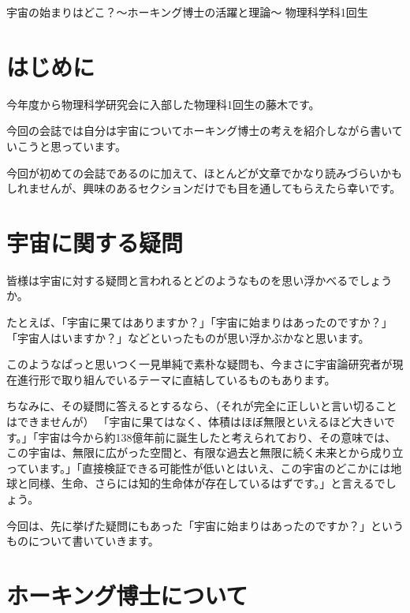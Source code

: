 \documentclass[10pt,b5paper,papersize,dvipdfmx]{jsbook}
\begin{document}


\kaishititle%
  {宇宙の始まりはどこ？～ホーキング博士の活躍と理論～}%
  {物理科学科1回生}%
  {}%

%
\section*{はじめに}
今年度から物理科学研究会に入部した物理科1回生の藤木です。\par
今回の会誌では自分は宇宙についてホーキング博士の考えを紹介しながら書いていこうと思っています。\par
今回が初めての会誌であるのに加えて、ほとんどが文章でかなり読みづらいかもしれませんが、興味のあるセクションだけでも目を通してもらえたら幸いです。\par


%
\section{宇宙に関する疑問}
皆様は宇宙に対する疑問と言われるとどのようなものを思い浮かべるでしょうか。\par
たとえば、「宇宙に果てはありますか？」「宇宙に始まりはあったのですか？」「宇宙人はいますか？」などといったものが思い浮かぶかなと思います。\par
このようなぱっと思いつく一見単純で素朴な疑問も、今まさに宇宙論研究者が現在進行形で取り組んでいるテーマに直結しているものもあります。\par
ちなみに、その疑問に答えるとするなら、（それが完全に正しいと言い切ることはできませんが）
「宇宙に果てはなく、体積はほぼ無限といえるほど大きいです。」「宇宙は今から約138億年前に誕生したと考えられており、その意味では、この宇宙は、無限に広がった空間と、有限な過去と無限に続く未来とから成り立っています。」「直接検証できる可能性が低いとはいえ、この宇宙のどこかには地球と同様、生命、さらには知的生命体が存在しているはずです。」と言えるでしょう。\par
今回は、先に挙げた疑問にもあった「宇宙に始まりはあったのですか？」というものについて書いていきます。\par


%
\section{ ホーキング博士について}
\end{document}
